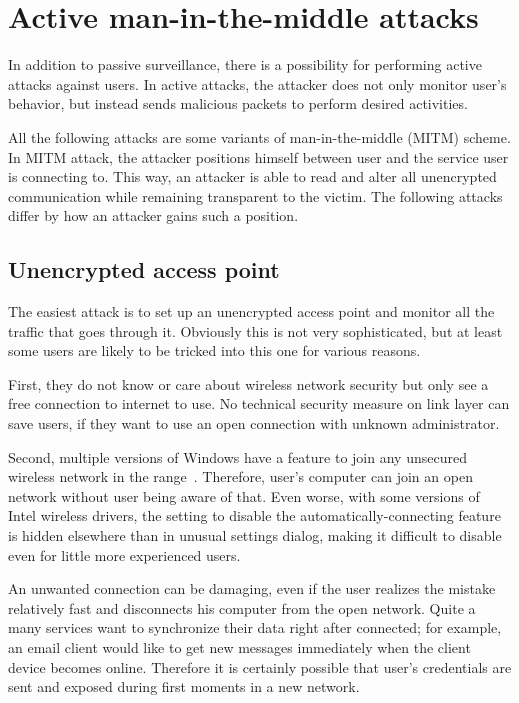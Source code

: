 \documentclass[12pt,a4paper,oneside,pdftex]{report}
\begin{document}


\chapter{Active man-in-the-middle attacks}
\label{chapter:attacks}

In addition to passive surveillance, there is a possibility for performing active attacks against users. In active attacks, the attacker does not only monitor user's behavior, but instead sends malicious packets to perform desired activities. 

All the following attacks are some variants of man-in-the-middle (MITM) scheme. In MITM attack, the attacker positions himself between user and the service user is connecting to. This way, an attacker is able to read and alter all unencrypted communication while remaining transparent to the victim. The following attacks differ by how an attacker gains such a position.

\section{Unencrypted access point}
\label{sec:attack_unencrypted}

The easiest attack is to set up an unencrypted access point and monitor all the traffic that goes through it. Obviously this is not very sophisticated, but at least some users are likely to be tricked into this one for various reasons.

First, they do not know or care about wireless network security but only see a free connection to internet to use. No technical security measure on link layer can save users, if they want to use an open connection with unknown administrator.

Second, multiple versions of Windows have a feature to join any unsecured wireless network in the range~\cite{dai2005attacking,windows_wifi_answers}. Therefore, user's computer can join an open network without user being aware of that. Even worse, with some versions of Intel wireless drivers, the setting to disable the automatically-connecting feature is hidden elsewhere than in unusual settings dialog, making it difficult to disable even for little more experienced users.~\cite{windows_wifi_answers}

An unwanted connection can be damaging, even if the user realizes the mistake relatively fast and disconnects his computer from the open network. Quite a many services want to synchronize their data right after connected; for example, an email client would like to get new messages immediately when the client device becomes online. Therefore it is certainly possible that user's credentials are sent and exposed during first moments in a new network.
\end{document}
